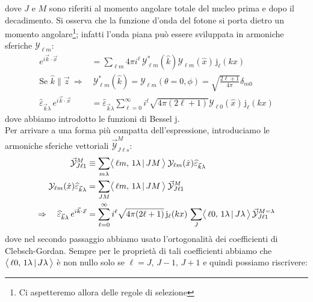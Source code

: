 dove $J$ e $M$ sono riferiti al momento angolare totale del nucleo prima e dopo il decadimento.
Si osserva che la funzione d'onda del fotone si porta dietro un momento angolare\footnote{Ci aspetteremo allora delle regole di selezione}; infatti l'onda piana può essere sviluppata in armoniche sferiche $\mathcal{Y}_{\ell m}$:
\begin{displaymath}
\begin{aligned}
e^{i\vec{k}\cdot\vec{x}} &=  \sum_{\ell m} 4\pi i^\ell \, \mathcal{Y}_{\ell m}^*(\hat{k})\mathcal{Y}_{\ell m}(\hat{x})\, \mathrm{j}_\ell (kx)  \\
%
\text{Se } \hat{k} \parallel \vec{z} \:\Rightarrow&\: \mathcal{Y}_{\ell m}^* (\hat{k}) = \mathcal{Y}_{\ell m} (\theta=0,\phi) = \sqrt{\frac{2\ell+1}{4\pi}} \delta_{m0} \\
%
\widehat{\varepsilon}_{\vec{k}\lambda}\, e^{i\vec{k}\cdot\vec{x}} &= \widehat{\varepsilon}_{\vec{k}\lambda} \sum_{\ell=0}^\infty i^\ell \sqrt{4\pi(2\ell+1)} \mathcal{Y}_{\ell 0}(\hat{x})\, \mathrm{j}_\ell (kx)
\end{aligned}
\end{displaymath}
dove abbiamo introdotto le funzioni di Bessel $\mathrm{j}$.\\
Per arrivare a una forma più compatta dell'espressione, introduciamo le armoniche sferiche vettoriali $\vec{\mathcal{Y}}^M_{J\ell s}$:
\begin{displaymath}
\begin{aligned}
\vec{\mathcal{Y}}^M_{J\ell 1} &\equiv \sum_{m\lambda} \bigl\langle\, \ell m ,\, 1\lambda\, |\, JM\, \bigr\rangle\: \mathcal{Y}_{\ell m} (\hat{x}) \widehat{\varepsilon}_{\vec{k}\lambda} \\
\mathcal{Y}_{\ell m} (\hat{x}) \widehat{\varepsilon}_{\vec{k}\lambda} &= \sum_{JM} \bigl\langle\, \ell m ,\, 1\lambda\, |\, JM\, \bigr\rangle \: \vec{\mathcal{Y}}^M_{J\ell 1} \\
\Rightarrow\quad \widehat{\varepsilon}_{\vec{k}\lambda}\, e^{i\vec{k}\cdot\vec{x}} &= \sum_{\ell=0}^\infty i^\ell \sqrt{4\pi(2\ell+1)}\, \mathrm{j}_\ell (kx) \, \sum_J \bigl\langle\, \ell 0 ,\, 1\lambda\, |\, J\lambda\, \bigr\rangle\, \vec{\mathcal{Y}}^{M=\lambda}_{J\ell 1}
\end{aligned}
\end{displaymath}
dove nel secondo passaggio abbiamo usato l'ortogonalità dei coefficienti di Clebsch-Gordan. Sempre per le proprietà di tali coefficienti abbiamo che $\bigl\langle\, \ell 0,\, 1\lambda\, |\, J\lambda\, \bigr\rangle$ è non nullo solo se $\ell = J,\,J-1,\,J+1$ e quindi possiamo riscrivere:
